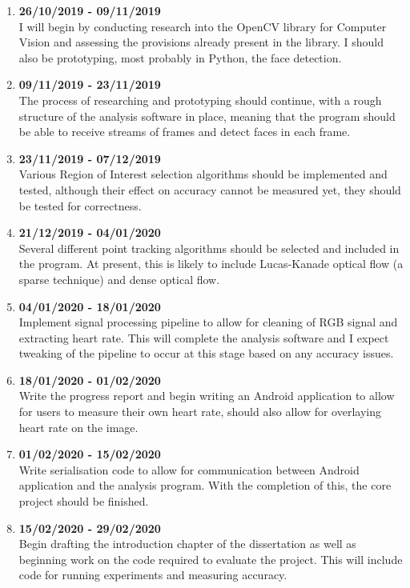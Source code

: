 \documentclass{article}
\begin{document}
\begin{enumerate}
\item \textbf{26/10/2019 - 09/11/2019} \\
I will begin by conducting research into the OpenCV library for Computer Vision and assessing the provisions already present in the library. I should also be prototyping, most probably in Python, the face detection.

\item \textbf{09/11/2019 - 23/11/2019} \\
The process of researching and prototyping should continue, with a rough structure of the analysis software in place, meaning that the program should be able to receive streams of frames and detect faces in each frame.

\item \textbf{23/11/2019 - 07/12/2019}\\
Various Region of Interest selection algorithms should be implemented and tested, although their effect on accuracy cannot be measured yet, they should be tested for correctness.

\item \textbf{21/12/2019 - 04/01/2020}\\
Several different point tracking algorithms should be selected and included in the program. At present, this is likely to include Lucas-Kanade optical flow (a sparse technique) and dense optical flow.

\item \textbf{04/01/2020 - 18/01/2020}\\
Implement signal processing pipeline to allow for cleaning of RGB signal and extracting heart rate. This will complete the analysis software and I expect tweaking of the pipeline to occur at this stage based on any accuracy issues.

\item \textbf{18/01/2020 - 01/02/2020}\\
Write the progress report and begin writing an Android application to allow for users to measure their own heart rate, should also allow for overlaying heart rate on the image.

\item \textbf{01/02/2020 - 15/02/2020}\\
Write serialisation code to allow for communication between Android application and the analysis program. With the completion of this, the core project should be finished.

\item \textbf{15/02/2020 - 29/02/2020}\\
Begin drafting the introduction chapter of the dissertation as well as beginning work on the code required to evaluate the project. This will include code for running experiments and measuring accuracy.


\end{enumerate}
\end{document}
